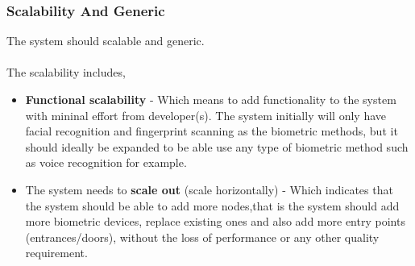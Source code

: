 \subsubsection{Scalability And Generic}
The system should scalable and generic.\\
\\The scalability includes,
\begin{itemize}
	\item  \textbf{Functional scalability} - Which means to add functionality to the system with mininal effort from developer(s).
		The system initially will only have facial recognition and fingerprint scanning as the biometric methods, but it should ideally be expanded to be able use any type of biometric method such as voice recognition for example.
	\item  The system needs to \textbf{scale out} (scale horizontally) - Which indicates that the system should be able to add more nodes,that 		is the system should add more biometric devices, replace existing ones and also add more entry points (entrances/doors), 			without the loss of performance or any other quality requirement.
\end{itemize}





